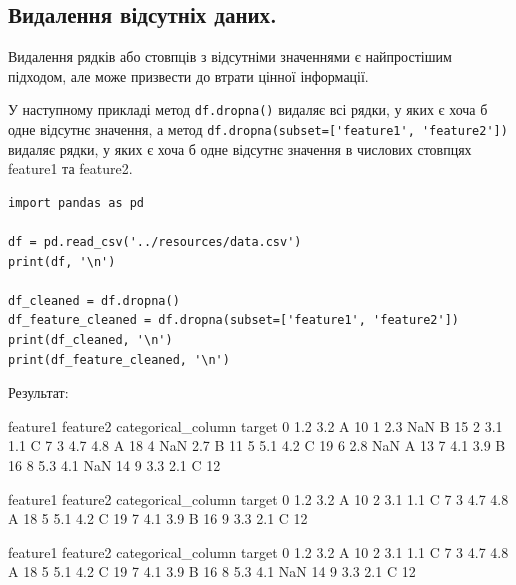 \subsection{Видалення відсутніх даних.}

Видалення рядків або стовпців з відсутніми значеннями є найпростішим підходом, але може 
призвести до втрати цінної інформації.

У наступному прикладі метод \verb|df.dropna()| видаляє всі рядки, у яких є хоча б одне відсутнє 
значення, а метод \verb|df.dropna(subset=['feature1', 'feature2'])| видаляє 
рядки, у яких є хоча б одне відсутнє значення в числових стовпцях feature1 та feature2.

\begin{lstlisting}
import pandas as pd

df = pd.read_csv('../resources/data.csv')
print(df, '\n')

df_cleaned = df.dropna()  
df_feature_cleaned = df.dropna(subset=['feature1', 'feature2'])
print(df_cleaned, '\n')
print(df_feature_cleaned, '\n')
\end{lstlisting}

Результат:

\begin{console}
   feature1  feature2 categorical_column  target
0       1.2       3.2                  A      10
1       2.3       NaN                  B      15
2       3.1       1.1                  C       7
3       4.7       4.8                  A      18
4       NaN       2.7                  B      11
5       5.1       4.2                  C      19
6       2.8       NaN                  A      13
7       4.1       3.9                  B      16
8       5.3       4.1                NaN      14
9       3.3       2.1                  C      12 

   feature1  feature2 categorical_column  target
0       1.2       3.2                  A      10
2       3.1       1.1                  C       7
3       4.7       4.8                  A      18
5       5.1       4.2                  C      19
7       4.1       3.9                  B      16
9       3.3       2.1                  C      12 

   feature1  feature2 categorical_column  target
0       1.2       3.2                  A      10
2       3.1       1.1                  C       7
3       4.7       4.8                  A      18
5       5.1       4.2                  C      19
7       4.1       3.9                  B      16
8       5.3       4.1                NaN      14
9       3.3       2.1                  C      12 
\end{console}

